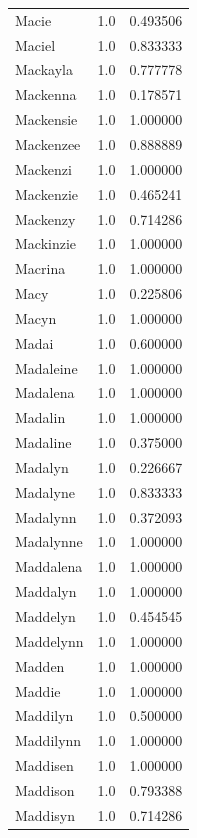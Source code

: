 \documentclass[
  letterpaper,
  DIV=11,
  numbers=noendperiod]{scrreprt}
\begin{document}
\begin{tabular}{lrr}
Macie           &   1.0 &   0.493506 \\
Maciel          &   1.0 &   0.833333 \\
Mackayla        &   1.0 &   0.777778 \\
Mackenna        &   1.0 &   0.178571 \\
Mackensie       &   1.0 &   1.000000 \\
Mackenzee       &   1.0 &   0.888889 \\
Mackenzi        &   1.0 &   1.000000 \\
Mackenzie       &   1.0 &   0.465241 \\
Mackenzy        &   1.0 &   0.714286 \\
Mackinzie       &   1.0 &   1.000000 \\
Macrina         &   1.0 &   1.000000 \\
Macy            &   1.0 &   0.225806 \\
Macyn           &   1.0 &   1.000000 \\
Madai           &   1.0 &   0.600000 \\
Madaleine       &   1.0 &   1.000000 \\
Madalena        &   1.0 &   1.000000 \\
Madalin         &   1.0 &   1.000000 \\
Madaline        &   1.0 &   0.375000 \\
Madalyn         &   1.0 &   0.226667 \\
Madalyne        &   1.0 &   0.833333 \\
Madalynn        &   1.0 &   0.372093 \\
Madalynne       &   1.0 &   1.000000 \\
Maddalena       &   1.0 &   1.000000 \\
Maddalyn        &   1.0 &   1.000000 \\
Maddelyn        &   1.0 &   0.454545 \\
Maddelynn       &   1.0 &   1.000000 \\
Madden          &   1.0 &   1.000000 \\
Maddie          &   1.0 &   1.000000 \\
Maddilyn        &   1.0 &   0.500000 \\
Maddilynn       &   1.0 &   1.000000 \\
Maddisen        &   1.0 &   1.000000 \\
Maddison        &   1.0 &   0.793388 \\
Maddisyn        &   1.0 &   0.714286 \\

\end{tabular}
\end{document}
